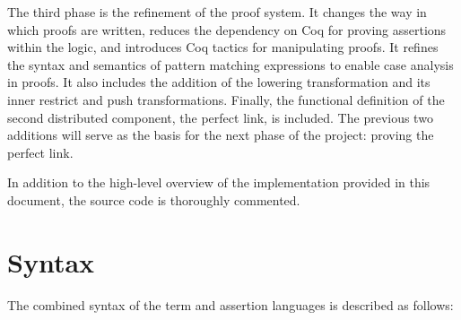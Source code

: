\documentclass[12pt]{article}
\begin{document}
The third phase is the refinement of the proof system.  It changes the
way in which proofs are written, reduces the dependency on Coq for
proving assertions within the logic, and introduces Coq tactics for
manipulating proofs.  It refines the syntax and semantics of pattern
matching expressions to enable case analysis in proofs.  It also
includes the addition of the lowering transformation and its inner
restrict and push transformations.  Finally, the functional definition
of the second distributed component, the perfect link, is included.  The
previous two additions will serve as the basis for the next phase of the
project: proving the perfect link.

In addition to the high-level overview of the implementation provided in
this document, the source code is thoroughly commented.

\newpage

\section{Syntax}

The combined syntax of the term and assertion languages is described as
follows:
\end{document}
